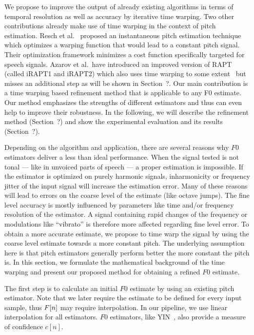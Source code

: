 We propose to improve the output of already existing algorithms in terms of temporal resolution as well as accuracy by iterative time warping. Two other contributions already make use of time warping in the context of pitch estimation. Resch et al.~\cite{resch} proposed an instantaneous pitch estimation technique which optimizes a warping function that would lead to a constant pitch signal. Their optimization framework minimizes a cost function specifically targeted for speech signals. Azarov et al.\ have introduced an improved version of RAPT (called iRAPT1 and iRAPT2) which also uses time warping to some extent~\cite{azarov2012instantaneous} but misses an additional step as will be shown in Section~?.
Our main contribution is a time warping based refinement method that is applicable to any F0 estimate. Our method emphasizes the strengths of different estimators and thus can even help to improve their robustness. In the following, we will describe the refinement method (Section~?) and show the experimental evaluation and its results (Section~?).

Depending on the algorithm and application, there are several reasons why $F0$ estimators deliver a less than ideal performance. When the signal tested is not tonal --- like in unvoiced parts of speech --- a proper estimation is impossible. If the estimator is optimized on purely harmonic signals, inharmonicity or frequency jitter of the input signal will increase the estimation error. Many of these reasons will lead to errors on the coarse level of the estimate (like octave jumps). The fine level accuracy is mostly influenced by parameters like time and/or frequency resolution of the estimator. A signal containing rapid changes of the frequency or modulations like ``vibrato'' is therefore more affected regarding fine level error. To obtain a more accurate estimate, we propose to time warp the signal by using the coarse level estimate towards a more constant pitch. The underlying assumption here is that pitch estimators generally perform better the more constant the pitch is.
In this section, we formulate the mathematical background of the time warping and present our proposed method for obtaining a refined $F0$ estimate.

The first step is to calculate an initial $F0$ estimate by using an existing pitch estimator. Note that we later require the estimate to be defined for every input sample, thus ${F}[n]$ may require interpolation. In our pipeline, we use linear interpolation for all estimators. $F0$ estimators, like YIN~\cite{de2002yin}, also provide a measure of confidence $c[n]$.
